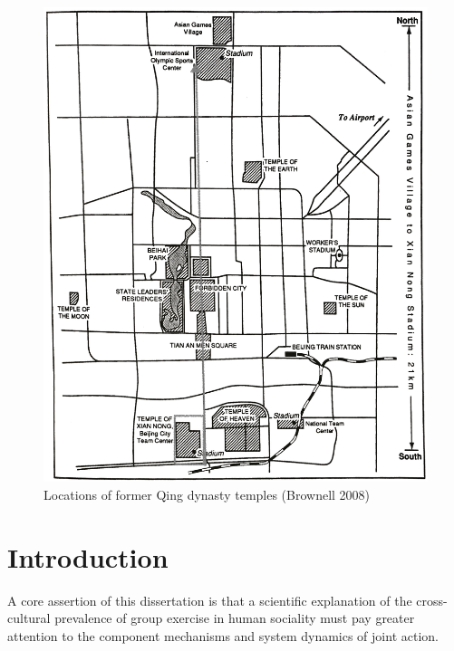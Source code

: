 \begin{figure}[htbp]
  \includegraphics[width = \linewidth]{images/beijingTemplesXNT.png}
  \caption{Locations of former Qing dynasty temples (Brownell 2008)}
  \label{fig:beijingTemplesXNT}
\end{figure}




\section{Introduction}

A core assertion of this dissertation is that a scientific explanation of the cross-cultural prevalence of group exercise in human sociality must pay greater attention to the component mechanisms and system dynamics of joint action.

